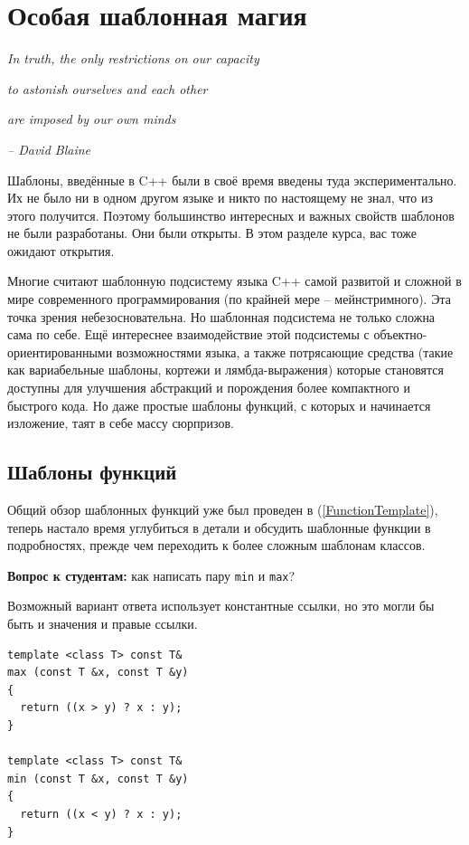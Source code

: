 \documentclass[a4paper,12pt,oneside]{article}
\newif\ifanswers
\begin{document}
\pagebreak
\section{Особая шаблонная магия}

\hfill\textit{In truth, the only restrictions on our capacity}

\hfill\textit{to astonish ourselves and each other}

\hfill\textit{are imposed by our own minds}{\vspace{0.5em}}

\hfill\textit{-- David Blaine}

Шаблоны, введённые в C++ были в своё время введены туда экспериментально. Их не было ни в одном другом языке и никто по настоящему не знал, что из этого получится. Поэтому большинство интересных и важных свойств шаблонов не были разработаны. Они были открыты. В этом разделе курса, вас тоже ожидают открытия.

Многие считают шаблонную подсистему языка C++ самой развитой и сложной в мире современного программирования (по крайней мере -- мейнстримного). Эта точка зрения небезосновательна. Но шаблонная подсистема не только сложна сама по себе. Ещё интереснее взаимодействие этой подсистемы с объектно-ориентированными возможностями языка, а также потрясающие средства (такие как вариабельные шаблоны, кортежи и лямбда-выражения) которые становятся доступны для улучшения абстракций и порождения более компактного и быстрого кода. Но даже простые шаблоны функций, с которых и начинается изложение, таят в себе массу сюрпризов.

\subsection{Шаблоны функций}\label{FunctionTemplates}

Общий обзор шаблонных функций уже был проведен в (\ref{FunctionTemplate}), теперь настало время углубиться в детали и обсудить шаблонные функции в подробностях, прежде чем переходить к более сложным шаблонам классов.

\textbf{Вопрос к студентам:} как написать пару \lstinline!min! и \lstinline!max!?

\ifanswers
Правильный ответ: вариантов много, один из них см. ниже:
\fi

Возможный вариант ответа использует константные ссылки, но это могли бы быть и значения и правые ссылки.

\begin{lstlisting}
template <class T> const T&
max (const T &x, const T &y) 
{
  return ((x > y) ? x : y);
}

template <class T> const T&
min (const T &x, const T &y)
{
  return ((x < y) ? x : y);
}
\end{lstlisting}
\end{document}

